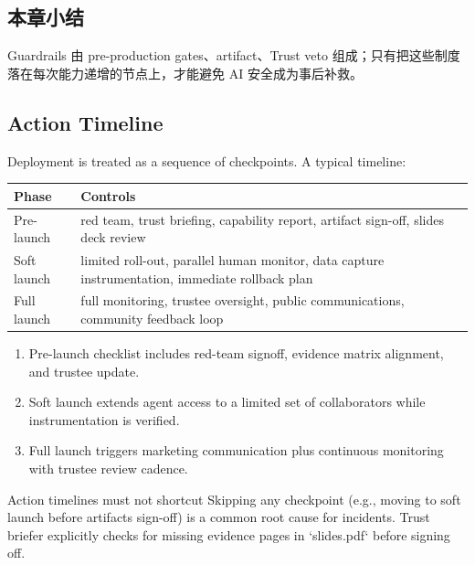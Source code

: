 \subsection{本章小结}

Guardrails 由 pre-production gates、artifact、Trust veto 组成；只有把这些制度落在每次能力递增的节点上，才能避免 AI 安全成为事后补救。

\subsection{Action Timeline}

Deployment is treated as a sequence of checkpoints. A typical timeline:

\begin{tabular}{p{}p{}}
\toprule
Phase & Controls \\
\midrule
Pre-launch & red team, trust briefing, capability report, artifact sign-off, slides deck review \\
Soft launch & limited roll-out, parallel human monitor, data capture instrumentation, immediate rollback plan \\
Full launch & full monitoring, trustee oversight, public communications, community feedback loop \\
\bottomrule
\end{tabular}

\begin{enumerate}
    \item Pre-launch checklist includes red-team signoff, evidence matrix alignment, and trustee update.
    \item Soft launch extends agent access to a limited set of collaborators while instrumentation is verified.
    \item Full launch triggers marketing communication plus continuous monitoring with trustee review cadence.
\end{enumerate}

\begin{warningbox}{Action timelines must not shortcut}
Skipping any checkpoint (e.g., moving to soft launch before artifacts sign-off) is a common root cause for incidents. Trust briefer explicitly checks for missing evidence pages in `slides.pdf` before signing off.
\end{warningbox}

